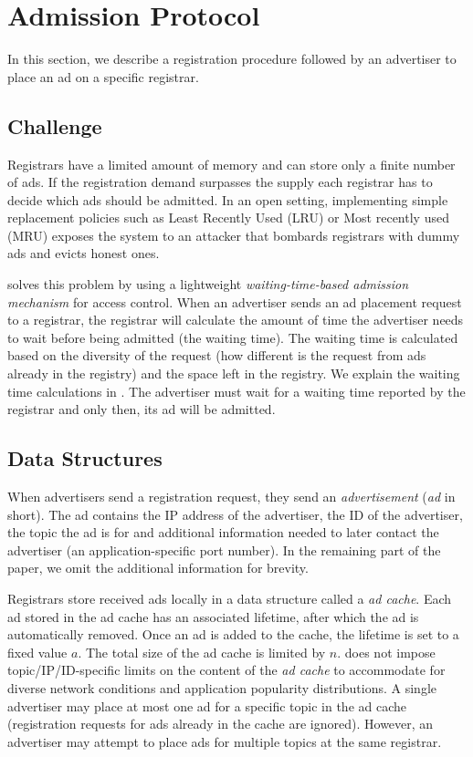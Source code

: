 
\section{Admission Protocol}\label{sec:admission}
In this section, we describe a registration procedure followed by an advertiser to place an ad on a specific registrar.

\subsection{Challenge}
Registrars have a limited amount of memory and can store only a finite number of ads. If the registration demand surpasses the supply each registrar has to decide which ads should be admitted. In an open setting, implementing simple replacement policies such as Least Recently Used (LRU) or Most recently used (MRU) exposes the system to an attacker that bombards registrars with dummy ads and evicts honest ones.

\sysname solves this problem by using a lightweight \textit{waiting-time-based admission mechanism} for access control. When an advertiser sends an ad placement request to a registrar, the registrar will calculate the amount of time the advertiser needs to wait before being admitted (\ie the waiting time). The waiting time is calculated based on the diversity of the request (\ie how different is the request from ads already in the registry) and the space left in the registry. We explain the waiting time calculations in . The advertiser must wait for a waiting time reported by the registrar and only then, its ad will be admitted. 

\subsection{Data Structures}
When advertisers send a registration request, they send an \emph{advertisement} (\emph{ad} in short). The ad contains the IP address of the advertiser, the ID of the advertiser, the topic the ad is for and additional information needed to later contact the advertiser (\eg an application-specific port number). In the remaining part of the paper, we omit the additional information for brevity. 

Registrars store received ads locally in a data structure called a \emph{ad cache}. Each ad stored in the ad cache has an associated lifetime, after which the ad is automatically removed. Once an ad is added to the cache, the lifetime is set to a fixed value $a$. The total size of the ad cache is limited by $n$. \sysname does not impose topic/IP/ID-specific limits on the content of the \emph{ad cache} to accommodate for diverse network conditions and application popularity distributions.
A single advertiser may place at most one ad for a specific topic in the ad cache (registration requests for ads already in the cache are ignored).
However, an advertiser may attempt to place ads for multiple topics at the same registrar.

